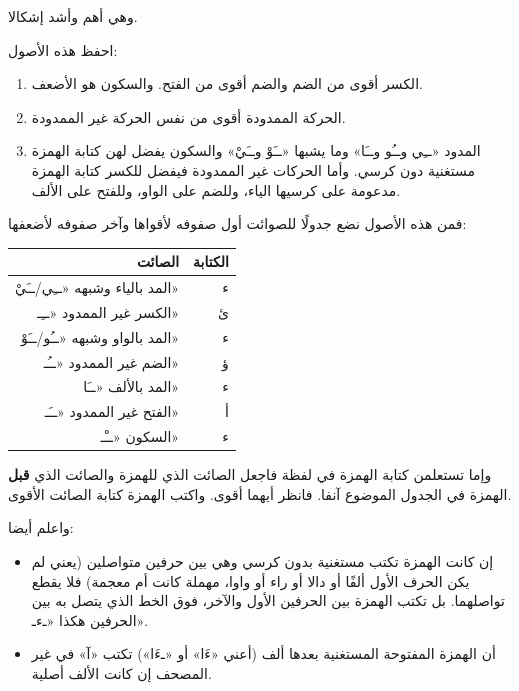 \documentclass[
  english,
  10pt,
]{article}
\newcounter{none} %
\providecommand{\tightlist}{%
  \setlength{\itemsep}{0pt}\setlength{\parskip}{0pt}}
\begin{document}
\begin{otherlanguage}{arabic}

\altfamily 

وهي أهم وأشد إشكالا.

احفظ هذه الأصول:

\begin{enumerate}
\def\labelenumi{\arabic{enumi}.}
\item
  الكسر أقوى من الضم والضم أقوى من الفتح. والسكون هو الأضعف.
\item
  الحركة الممدودة أقوى من نفس الحركة غير الممدودة.
\item
  المدود «ــِي وــُو وــَا» وما يشبها «ــَوْ وــَيْ» والسكون يفضل لهن كتابة
  الهمزة مستغنية دون كرسي. وأما الحركات غير الممدودة فيفضل للكسر كتابة
  الهمزة مدعومة على كرسيها الياء، وللضم على الواو، وللفتح على الألف.
\end{enumerate}

فمن هذه الأصول نضع جدولًا للصوائت أول صفوفه لأقواها وآخر صفوفه لأضعفها:

{\def\LTcaptype{none} %
\begin{longtable}[]{@{}rr@{}}
\toprule\noalign{}
الصائت & الكتابة \\
\midrule\noalign{}
\endhead
\bottomrule\noalign{}
\endlastfoot
المد بالياء وشبهه «ــِي/ــَيْ» & ء \\
الكسر غير الممدود «ــِـ» & ئ \\
المد بالواو وشبهه «ــُو/ــَوْ» & ء \\
الضم غير الممدود «ــُـ» & ؤ \\
المد بالألف «ــَا» & ء \\
الفتح غير الممدود «ــَـ» & أ \\
السكون «ــْـ» & ء \\
\end{longtable}
}

وإما تستعلمن كتابة الهمزة في لفظة فاجعل الصائت الذي للهمزة والصائت الذي
\textbf{قبل} الهمزة في الجدول الموضوع آنفا. فانظر أيهما أقوى. واكتب
الهمزة كتابة الصائت الأقوى.

واعلم أيضا:

\begin{itemize}
\tightlist
\item
  إن كانت الهمزة تكتب مستغنية بدون كرسي وهي بين حرفين متواصلين (يعني لم
  يكن الحرف الأول ألفًا أو دالا أو راء أو واوا، مهملة كانت أم معجمة) فلا
  يقطع تواصلهما. بل تكتب الهمزة بين الحرفين الأول والآخر، فوق الخط الذي
  يتصل به بين الحرفين هكذا «ـءـ».
\item
  أن الهمزة المفتوحة المستغنية بعدها ألف (أعني «ءَا» أو «ـءَا») تكتب «آ»
  في غير المصحف إن كانت الألف أصلية.
\end{itemize}


\end{otherlanguage}
\end{document}
